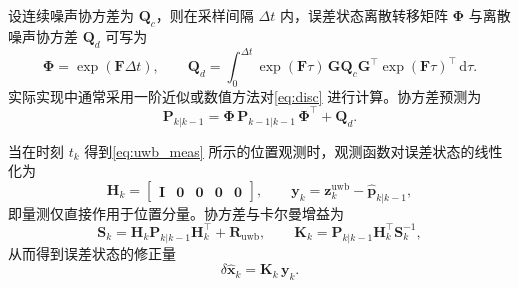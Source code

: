 设连续噪声协方差为 $\mathbf{Q}_c$，则在采样间隔 $\Delta t$ 内，误差状态离散转移矩阵 $\boldsymbol\Phi$ 与离散噪声协方差 $\mathbf{Q}_d$ 可写为
\begin{equation}
    \boldsymbol\Phi = \exp(\mathbf{F}\Delta t),\qquad
    \mathbf{Q}_d
    =
    \int_0^{\Delta t}
        \exp(\mathbf{F}\tau)\,\mathbf{G}\mathbf{Q}_c\mathbf{G}^\top
        \exp(\mathbf{F}\tau)^\top
    \,\mathrm{d}\tau.
    \label{eq:disc}
\end{equation}
实际实现中通常采用一阶近似或数值方法对\eqref{eq:disc} 进行计算。协方差预测为
\begin{equation}
    \mathbf{P}_{k|k-1}
    =
    \boldsymbol\Phi\,\mathbf{P}_{k-1|k-1}\,\boldsymbol\Phi^\top
    + \mathbf{Q}_d.
    \label{eq:covprop}
\end{equation}

当在时刻 $t_k$ 得到\eqref{eq:uwb_meas} 所示的位置观测时，观测函数对误差状态的线性化为
\begin{equation}
    \mathbf{H}_k
    =
    \begin{bmatrix}
        \mathbf{I} & \mathbf{0} & \mathbf{0} & \mathbf{0} & \mathbf{0}
    \end{bmatrix},\qquad
    \mathbf{y}_k
    =
    \mathbf{z}_k^{\mathrm{uwb}} - \hat{\mathbf{p}}_{k|k-1},
    \label{eq:meas_lin}
\end{equation}
即量测仅直接作用于位置分量。协方差与卡尔曼增益为
\begin{equation}
    \mathbf{S}_k
    =
    \mathbf{H}_k \mathbf{P}_{k|k-1} \mathbf{H}_k^\top
    + \mathbf{R}_{\mathrm{uwb}},
    \qquad
    \mathbf{K}_k
    =
    \mathbf{P}_{k|k-1}\mathbf{H}_k^\top \mathbf{S}_k^{-1},
    \label{eq:gain}
\end{equation}
从而得到误差状态的修正量
\begin{equation}
    \delta\hat{\mathbf{x}}_k = \mathbf{K}_k\,\mathbf{y}_k.
\end{equation}

